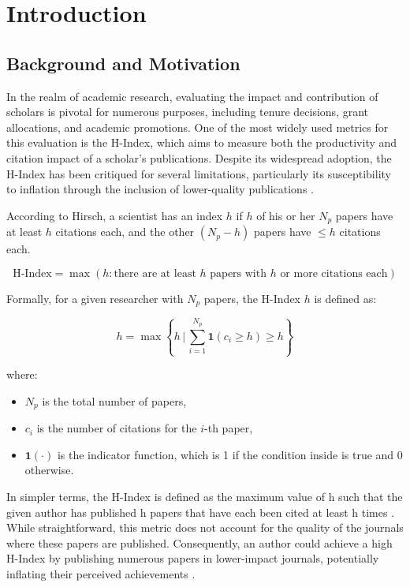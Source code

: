 \chapter{Introduction}
\label{ch:intro}

\section{Background and Motivation}
In the realm of academic research, evaluating the impact and contribution of
scholars is pivotal for numerous purposes, including tenure decisions, grant
allocations, and academic promotions. One of the most widely used metrics for
this evaluation is the H-Index, which aims to measure both the productivity and
citation impact of a scholar’s publications. Despite its widespread adoption,
the H-Index has been critiqued for several limitations, particularly its
susceptibility to inflation through the inclusion of lower-quality publications
\cite{costas2007h, tonta2020monetary}.

According to Hirsch, a scientist has an index \( h \) if \( h \) of his or her
\( N_p \) papers have at least \( h \) citations each, and the other \( (N_p -
h) \) papers have \(\leq h \) citations each.

\[
      \text{H-Index} = \max \left( h : \text{there are at least } h \text{ papers with } h \text{ or more citations each} \right)
\]

Formally, for a given researcher with \( N_p \) papers, the H-Index \( h \) is
defined as:

\[
      h = \max \left\{ h \, \Bigg| \, \sum_{i=1}^{N_p} \mathbf{1} (c_i \geq h) \geq h \right\}
\]

where:
\begin{itemize}
      \item \( N_p \) is the total number of papers,
      \item \( c_i \) is the number of citations for the \( i \)-th paper,
      \item \( \mathbf{1}(\cdot) \) is the indicator function, which is 1 if the condition inside is true and 0 otherwise.
\end{itemize} In simpler terms, the H-Index is defined as the maximum value of h
such that the given author has published h papers that have each been cited at least h times \cite{hirsch2005index}.
While straightforward, this metric does not account for the quality of the journals where
these papers are published. Consequently, an author could achieve a high H-Index
by publishing numerous papers in lower-impact journals, potentially inflating their perceived achievements \cite{tonta2020monetary}.

